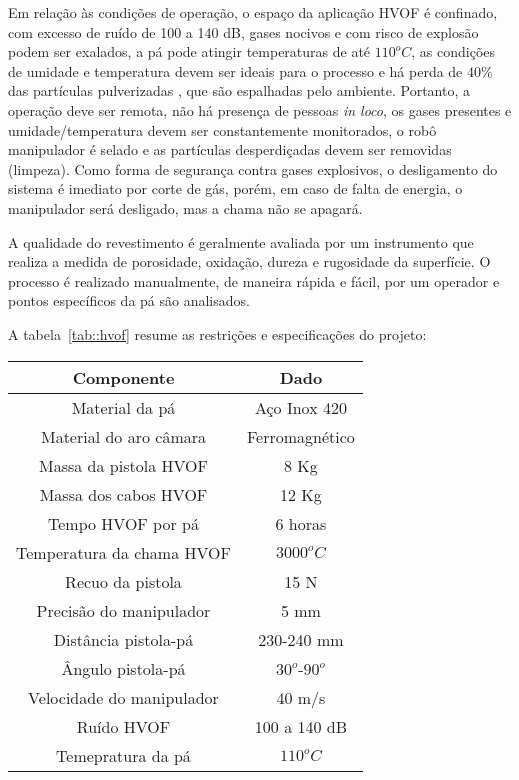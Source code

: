  

Em relação às condições de operação, o espaço da aplicação HVOF é confinado, com
excesso de ruído de 100 a 140 dB, gases nocivos e com risco de explosão podem
ser exalados, a pá pode atingir temperaturas de até $110^oC$, as condições de
umidade e temperatura devem ser ideais para o processo e há perda de $40\%$
das partículas pulverizadas  \citep{wu2006rebound}, que são espalhadas pelo
ambiente. Portanto, a operação deve ser remota, não há presença de pessoas \textit{in loco}, os gases
presentes e umidade/temperatura devem ser constantemente monitorados, o robô
manipulador é selado e as partículas desperdiçadas devem ser removidas
(limpeza). Como forma de segurança contra gases explosivos, o desligamento do
sistema é imediato por corte de gás, porém, em caso de falta de energia, o
manipulador será desligado, mas a chama não se apagará.

A qualidade do revestimento é geralmente avaliada por um instrumento que
realiza a medida de porosidade, oxidação, dureza e rugosidade da superfície. O
processo é realizado manualmente, de maneira rápida e fácil, por um operador e
pontos específicos da pá são analisados.

A tabela~\ref{tab::hvof} resume as restrições e especificações do
projeto:

\begin{center}
\begin{tabular}{  c | c  }
  \hline
  \textbf{Componente} & \textbf{Dado} \\ \hline
  Material da pá & Aço Inox 420 \\ \hline
  Material do aro câmara & Ferromagnético  \\ \hline
  Massa da pistola HVOF & 8 Kg  \\ \hline
  Massa dos cabos HVOF & 12 Kg  \\ \hline
  Tempo HVOF por pá & 6 horas \\ \hline
  Temperatura da chama HVOF & $3000^oC$ \\ \hline
  Recuo da pistola & 15 N \\ \hline
  Precisão do manipulador& 5 mm \\ \hline
  Distância pistola-pá & 230-240 mm \\ \hline
  Ângulo pistola-pá & $30^o$-$90^o$ \\ \hline
  Velocidade do manipulador & 40 m/s \\ \hline
  Ruído HVOF & 100 a 140 dB \\ \hline
  Temepratura da pá & $110^oC$ \\
  \hline
\end{tabular}
\label{tab::hvof}
\end{center}

